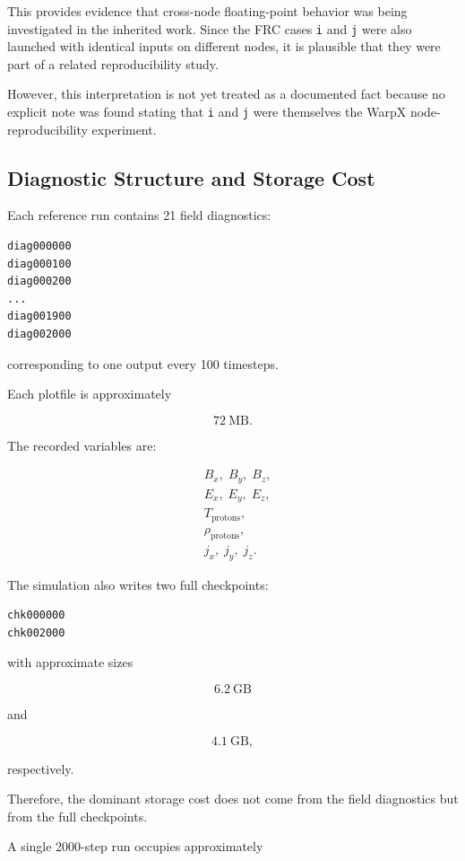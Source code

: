\documentclass[11pt,a4paper]{article}
\begin{document}
This provides evidence that cross-node floating-point behavior was being investigated in the inherited work. Since the FRC cases \texttt{i} and \texttt{j} were also launched with identical inputs on different nodes, it is plausible that they were part of a related reproducibility study.

However, this interpretation is not yet treated as a documented fact because no explicit note was found stating that \texttt{i} and \texttt{j} were themselves the WarpX node-reproducibility experiment.

\subsection{Diagnostic Structure and Storage Cost}

Each reference run contains 21 field diagnostics:

\begin{lstlisting}
diag000000
diag000100
diag000200
...
diag001900
diag002000
\end{lstlisting}

corresponding to one output every 100 timesteps.

Each plotfile is approximately

\[
72~\mathrm{MB}.
\]

The recorded variables are:

\begin{align*}
&B_x,\;B_y,\;B_z,\\
&E_x,\;E_y,\;E_z,\\
&T_{\mathrm{protons}},\\
&\rho_{\mathrm{protons}},\\
&j_x,\;j_y,\;j_z.
\end{align*}

The simulation also writes two full checkpoints:

\begin{lstlisting}
chk000000
chk002000
\end{lstlisting}

with approximate sizes

\[
6.2~\mathrm{GB}
\]

and

\[
4.1~\mathrm{GB},
\]

respectively.

Therefore, the dominant storage cost does not come from the field diagnostics but from the full checkpoints.

A single 2000-step run occupies approximately
\end{document}
